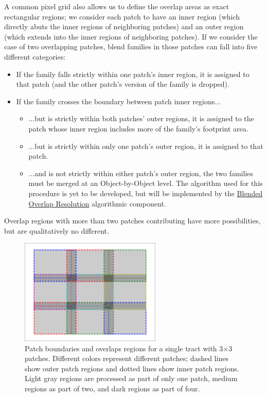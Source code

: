 A common pixel grid also allows us to define the overlap areas as exact rectangular regions; we consider each patch to have an inner region (which directly abuts the inner regions of neighboring patches) and an outer region (which extends into the inner regions of neighboring patches).  If we consider the case of two overlapping patches, blend families in those patches can fall into five different categories:
\begin{itemize}
\item If the family falls strictly within one patch's inner region, it is assigned to that patch (and the other patch's version of the family is dropped).
\item If the family crosses the boundary between patch inner regions...
  \begin{itemize}
  \item ...but is strictly within both patches' outer regions, it is assigned to the patch whose inner region includes more of the family's footprint area.
  \item ...but is strictly within only one patch's outer region, it is assigned to that patch.
  \item ...and is not strictly within either patch's outer region, the two families must be merged at an Object-by-Object level.  The algorithm used for this procedure is yet to be developed, but will be implemented by the \hyperref[sec:acBlendedOverlapResolution]{Blended Overlap Resolution} algorithmic component.
  \end{itemize}
\end{itemize}
Overlap regions with more than two patches contributing have more possibilities, but are qualitatively no different.

\begin{figure}
\centering
\includegraphics[width=0.6\textwidth]{figures/patch_overlaps.pdf}
\caption{Patch boundaries and overlaps regions for a single tract with 3$\times$3 patches.  Different colors represent different patches; dashed lines show outer patch regions and dotted lines show inner patch regions.  Light gray regions are processed as part of only one patch, medium regions as part of two, and dark regions as part of four.
\label{fig:patch_overlaps}}
\end{figure}

